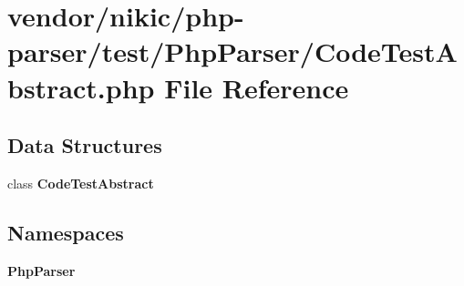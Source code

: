 \section{vendor/nikic/php-\/parser/test/\+Php\+Parser/\+Code\+Test\+Abstract.php File Reference}
\label{_code_test_abstract_8php}
\subsection*{Data Structures}
\begin{DoxyCompactItemize}
\item 
class {\bf Code\+Test\+Abstract}
\end{DoxyCompactItemize}
\subsection*{Namespaces}
\begin{DoxyCompactItemize}
\item 
 {\bf Php\+Parser}
\end{DoxyCompactItemize}

